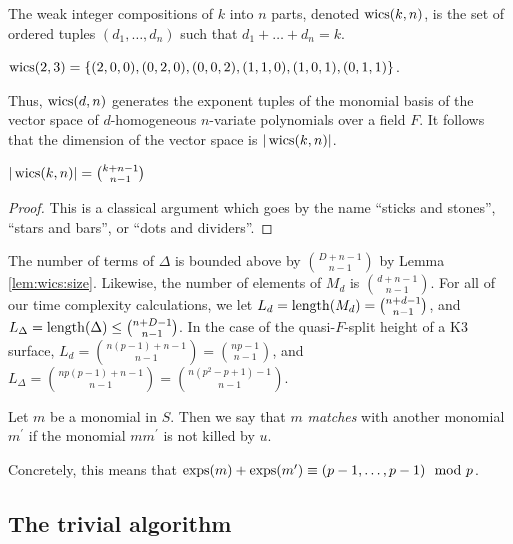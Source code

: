 \begin{defn}
    The weak integer compositions of $k$ into $n$ parts, 
    denoted $\operatorname{wics}(k, n)$, is the set of ordered tuples 
	\((d_{1}, \ldots, d_{n})\) such that 
    \(d_{1} + \ldots + d_{n} = k\).
\end{defn}

\begin{ex}
    $\operatorname{wics}(2, 3) = \lbrace (2, 0, 0), (0, 2, 0), (0, 0, 2), (1, 1, 0), (1, 0, 1), (0, 1, 1) \rbrace$.
\end{ex}

Thus, $\operatorname{wics}(d, n)$ generates the exponent tuples of the 
monomial basis of the vector space of $d$-homogeneous 
$n$-variate polynomials over a field $F$.
It follows that the dimension of the vector space is $|\operatorname{wics}(k, n)|$.

\begin{lem}
    \label{lem:wics:size}
    $|\operatorname{wics}(k, n)| = \binom{k + n - 1}{n - 1}$
\end{lem}

\begin{proof}
	This is a classical argument which goes by the 
    name ``sticks and stones'', ``stars and bars'', or 
    ``dots and dividers''.
\end{proof}


\begin{rmk}
    The number of terms of \(\Delta\) is bounded 
    above by \(\binom{D+n-1}{n-1}\) by Lemma \ref{lem:wics:size}.
    Likewise, the number of elements of 
    \(M_{d}\) is \(\binom{d+n-1}{n-1}\).
    For all of our time complexity calculations, 
    we let $L_{d} = \operatorname{length}(M_{d}) = \binom{n + d - 1}{n - 1}$, 
    and $L_{\Delta} = \operatorname{length}(\Delta) \leq \binom{n + D - 1}{n - 1}$.
    In the case of the quasi-\(F\)-split height of a K3 surface, 
    $L_{d} = \binom{n(p - 1) + n - 1}{n - 1} = \binom{np - 1}{n - 1}$, 
    and $L_{\Delta} = \binom{np(p - 1) + n - 1}{n - 1} = \binom{n(p^2 - p + 1) - 1}{n - 1}$.
\end{rmk}

\begin{defn}
	Let \(m\) be a monomial in \(S\). 
	Then we say that \(m\) \textit{matches}
	with another monomial \(m^{\prime}\) 
	if the monomial \(mm^{\prime}\) is
	not killed by \(u\).
\end{defn}

Concretely, this means that $\operatorname{exps}(m) + \operatorname{exps}(m^{\prime}) \equiv (p - 1, \dots, p - 1) \mod p$.

\subsection{The trivial algorithm}

